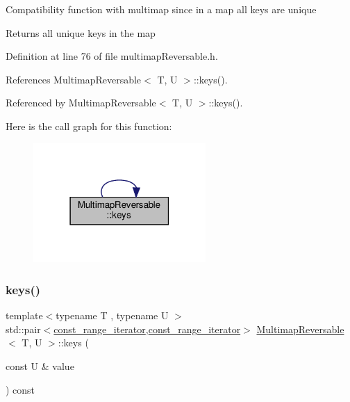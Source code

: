 Compatibility function with multimap since in a map all keys are unique \begin{DoxyReturn}{Returns}
all unique keys in the map 
\end{DoxyReturn}


Definition at line 76 of file multimap\+Reversable.\+h.



References Multimap\+Reversable$<$ T, U $>$\+::keys().



Referenced by Multimap\+Reversable$<$ T, U $>$\+::keys().

Here is the call graph for this function\+:\nopagebreak
\begin{figure}[H]
\begin{center}
\leavevmode
\includegraphics[width=186pt]{classMultimapReversable_a135171aef1cc98eb99df8eb63843e4da_cgraph}
\end{center}
\end{figure}
\mbox{\label{classMultimapReversable_a3bbe5ef69fa9537be66d4cc020a6306e}} 
\subsubsection{\texorpdfstring{keys()}{keys()}\hspace{0.1cm}{\footnotesize\ttfamily [2/2]}}
{\footnotesize\ttfamily template$<$typename T , typename U $>$ \\
std\+::pair$<$\hyperlink{classMultimapReversable_ae87bcf568586e240e0d294050fa248cb}{const\+\_\+range\+\_\+iterator},\hyperlink{classMultimapReversable_ae87bcf568586e240e0d294050fa248cb}{const\+\_\+range\+\_\+iterator}$>$ \hyperlink{classMultimapReversable}{Multimap\+Reversable}$<$ T, U $>$\+::keys (\begin{DoxyParamCaption}\item[{const U \&}]{value }\end{DoxyParamCaption}) const\hspace{0.3cm}{\ttfamily [inline]}}

